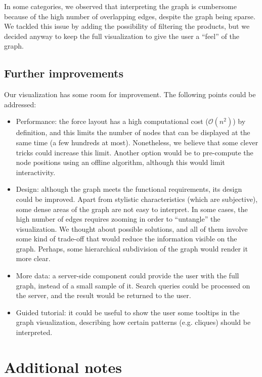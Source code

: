 \documentclass[a4paper,12pt]{article}
\begin{document}
In some categories, we observed that interpreting the graph is cumbersome because of the high number of overlapping edges, despite the graph being sparse. We tackled this issue by adding the possibility of filtering the products, but we decided anyway to keep the full visualization to give the user a ``feel'' of the graph.

\subsection{Further improvements}
Our visualization has some room for improvement. The following points could be addressed:
\begin{itemize}
	\item Performance: the force layout has a high computational cost ($\mathcal{O}(n^2)$) by definition, and this limits the number of nodes that can be displayed at the same time (a few hundreds at most). Nonetheless, we believe that some clever tricks could increase this limit. Another option would be to pre-compute the node positions using an offline algorithm, although this would limit interactivity.
	\item Design: although the graph meets the functional requirements, its design could be improved. Apart from stylistic characteristics (which are subjective), some dense areas of the graph are not easy to interpret. In some cases, the high number of edges requires zooming in order to ``untangle'' the visualization. We thought about possible solutions, and all of them involve some kind of trade-off that would reduce the information visible on the graph. Perhaps, some hierarchical subdivision of the graph would render it more clear.
	\item More data: a server-side component could provide the user with the full graph, instead of a small sample of it. Search queries could be processed on the server, and the result would be returned to the user.
	\item Guided tutorial: it could be useful to show the user some tooltips in the graph visualization, describing how certain patterns (e.g. cliques) should be interpreted. 
\end{itemize}

\newpage

\setcounter{secnumdepth}{0} %
\section{Additional notes}
\end{document}
